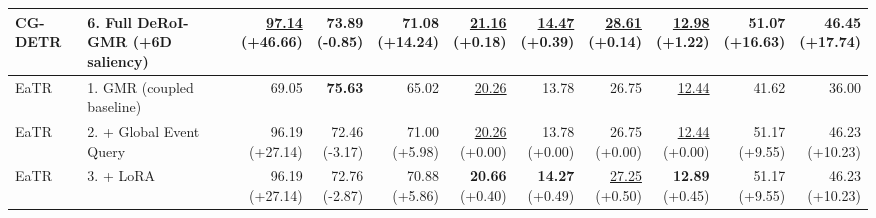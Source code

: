 \documentclass{article}
\begin{document}
{\begin{tabular}{llrrrrrrrrr}
CG-DETR & 6. Full DeRoI-GMR (+6D saliency) & \shortstack{\underline{97.14} \\ {\scriptsize (+46.66)}} & \shortstack{73.89 \\ {\scriptsize (-0.85)}} & \shortstack{71.08 \\ {\scriptsize (+14.24)}} & \shortstack{\underline{21.16} \\ {\scriptsize (+0.18)}} & \shortstack{\underline{14.47} \\ {\scriptsize (+0.39)}} & \shortstack{\underline{28.61} \\ {\scriptsize (+0.14)}} & \shortstack{\underline{12.98} \\ {\scriptsize (+1.22)}} & \shortstack{51.07 \\ {\scriptsize (+16.63)}} & \shortstack{46.45 \\ {\scriptsize (+17.74)}} \\
\midrule
EaTR & 1. GMR (coupled baseline) & 69.05 & \textbf{75.63} & 65.02 & \underline{20.26} & 13.78 & 26.75 & \underline{12.44} & 41.62 & 36.00 \\
EaTR & 2. + Global Event Query & \shortstack{96.19 \\ {\scriptsize (+27.14)}} & \shortstack{72.46 \\ {\scriptsize (-3.17)}} & \shortstack{71.00 \\ {\scriptsize (+5.98)}} & \shortstack{\underline{20.26} \\ {\scriptsize (+0.00)}} & \shortstack{13.78 \\ {\scriptsize (+0.00)}} & \shortstack{26.75 \\ {\scriptsize (+0.00)}} & \shortstack{\underline{12.44} \\ {\scriptsize (+0.00)}} & \shortstack{51.17 \\ {\scriptsize (+9.55)}} & \shortstack{46.23 \\ {\scriptsize (+10.23)}} \\
EaTR & 3. + LoRA & \shortstack{96.19 \\ {\scriptsize (+27.14)}} & \shortstack{72.76 \\ {\scriptsize (-2.87)}} & \shortstack{70.88 \\ {\scriptsize (+5.86)}} & \shortstack{\textbf{20.66} \\ {\scriptsize (+0.40)}} & \shortstack{\textbf{14.27} \\ {\scriptsize (+0.49)}} & \shortstack{\underline{27.25} \\ {\scriptsize (+0.50)}} & \shortstack{\textbf{12.89} \\ {\scriptsize (+0.45)}} & \shortstack{51.17 \\ {\scriptsize (+9.55)}} & \shortstack{46.23 \\ {\scriptsize (+10.23)}} \\

\end{tabular}}
\end{document}
